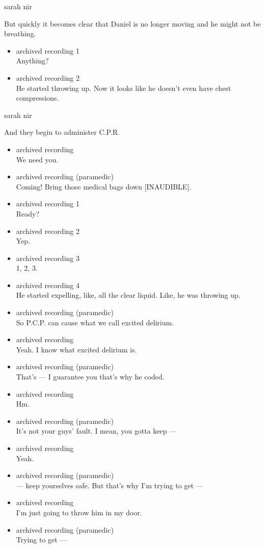 sarah nir

But quickly it becomes clear that Daniel is no longer moving and he
might not be breathing.

\begin{itemize}
\item
  archived recording 1\\
  Anything?
\item
  archived recording 2\\
  He started throwing up. Now it looks like he doesn't even have chest
  compressions.
\end{itemize}

sarah nir

And they begin to administer C.P.R.

\begin{itemize}
\item
  archived recording\\
  We need you.
\item
  archived recording (paramedic)\\
  Coming! Bring those medical bags down {[}INAUDIBLE{]}.
\item
  archived recording 1\\
  Ready?
\item
  archived recording 2\\
  Yep.
\item
  archived recording 3\\
  1, 2, 3.
\item
  archived recording 4\\
  He started expelling, like, all the clear liquid. Like, he was
  throwing up.
\item
  archived recording (paramedic)\\
  So P.C.P. can cause what we call excited delirium.
\item
  archived recording\\
  Yeah. I know what excited delirium is.
\item
  archived recording (paramedic)\\
  That's --- I guarantee you that's why he coded.
\item
  archived recording\\
  Hm.
\item
  archived recording (paramedic)\\
  It's not your guys' fault. I mean, you gotta keep ---
\item
  archived recording\\
  Yeah.
\item
  archived recording (paramedic)\\
  --- keep yourselves safe. But that's why I'm trying to get ---
\item
  archived recording\\
  I'm just going to throw him in my door.
\item
  archived recording (paramedic)\\
  Trying to get ---
\end{itemize}


